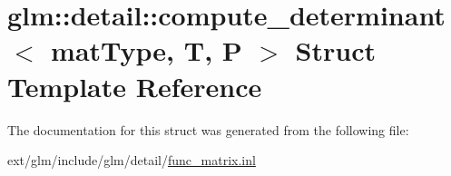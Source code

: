 \hypertarget{structglm_1_1detail_1_1compute__determinant}{\section{glm\-:\-:detail\-:\-:compute\-\_\-determinant$<$ mat\-Type, T, P $>$ Struct Template Reference}
\label{structglm_1_1detail_1_1compute__determinant}
}


The documentation for this struct was generated from the following file\-:\begin{DoxyCompactItemize}
\item 
ext/glm/include/glm/detail/\hyperlink{func__matrix_8inl}{func\-\_\-matrix.\-inl}\end{DoxyCompactItemize}

